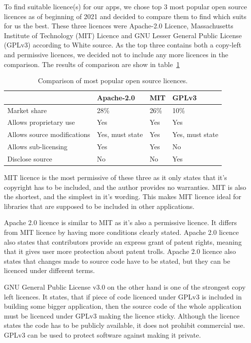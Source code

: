 To find suitable licence(s) for our apps, we chose top 3 most popular open source licences as of beginning of 2021 and decided
to compare them to find which suits for us the best.
These three licences were Apache-2.0 Licence, Massachusetts Institute of Technology (MIT) Licence and GNU Lesser General Public License (GPLv3) according to White source.
As the top three contains both a copy-left and permissive licences, we decided not to include any more licences in the comparison.
\cite{open-source-licences}
The results of comparison are show in table~\ref{tab:open-source-licence-comparison}
\begin{table}[H]
    \centering
    \begin{tabular}{ | p{4cm} | p{2cm} | p{2cm} | p{2cm} |}
        \hline
         & Apache-2.0 & MIT & GPLv3\\
        \hline
        Market share & 28\% & 26\% & 10\% \\
        \hline
        Allows proprietary use & Yes & Yes & Yes\\
        \hline
        Allows source modifications & Yes, must state & Yes & Yes, must state\\
        \hline
        Allows sub-licensing & Yes & Yes & No\\
        \hline
        Disclose source & No & No & Yes\\
        \hline
    \end{tabular}
    \caption{Comparison of most popular open source licences.}
    \label{tab:open-source-licence-comparison}
\end{table}

MIT licence is the most permissive of these three as it only states that it's copyright has to be included, and
the author provides no warranties.
MIT is also the shortest, and the simplest in it's wording.
This makes MIT licence ideal for libraries that are supposed to be included in other applications.
\cite{mit-licences}

Apache 2.0 licence is similar to MIT as it's also a permissive licence.
It differs from MIT licence by having more conditions clearly stated.
Apache 2.0 licence also states that contributors provide an express grant of patent rights, meaning that it gives
user more protection about patent trolls.
Apache 2.0 licence also states that changes made to source code have to be stated, but they can be licenced under different terms.
\cite{apache-2-licences}

GNU General Public License v3.0 on the other hand is one of the strongest copy left licences.
It states, that if piece of code licenced under GPLv3 is included in building some bigger application,
then the source code of the whole application must be licenced under GPLv3 making the licence sticky.
Although the licence states the code has to be publicly available, it does not prohibit commercial use.
GPLv3 can be used to protect software against making it private.
\cite{gplv3-licence}

